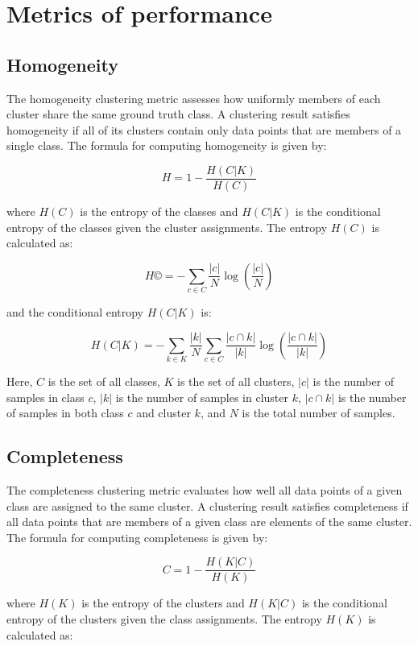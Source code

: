 \documentclass[a4paper,12pt]{article}
\begin{document}
		

	
	
	
\newpage
\section{Metrics of performance}

	\subsection*{Homogeneity}
		
		The homogeneity clustering metric assesses how uniformly members of each cluster share the same ground truth class. A clustering result satisfies homogeneity if all of its clusters contain only data points that are members of a single class. The formula for computing homogeneity is given by:
		
		\[ H = 1 - \frac{H(C|K)}{H(C)} \]
		
		where $H(C)$ is the entropy of the classes and $H(C|K)$ is the conditional entropy of the classes given the cluster assignments. The entropy $H(C)$ is calculated as:
		
		\[ H© = - \sum_{c \in C} \frac{|c|}{N} \log \left( \frac{|c|}{N} \right) \]
		
		and the conditional entropy $H(C|K)$ is:
		
		\[ H(C|K) = - \sum_{k \in K} \frac{|k|}{N} \sum_{c \in C} \frac{|c \cap k|}{|k|} \log \left( \frac{|c \cap k|}{|k|} \right) \]
		
		Here, $C$ is the set of all classes, $K$ is the set of all clusters, $|c|$ is the number of samples in class $c$, $|k|$ is the number of samples in cluster $k$, $|c \cap k|$ is the number of samples in both class $c$ and cluster $k$, and $N$ is the total number of samples.
	
	\subsection*{Completeness}
		 
		The completeness clustering metric evaluates how well all data points of a given class are assigned to the same cluster. A clustering result satisfies completeness if all data points that are members of a given class are elements of the same cluster. The formula for computing completeness is given by:
		
		\[ C = 1 - \frac{H(K|C)}{H(K)} \]
		
		where $H(K)$ is the entropy of the clusters and $H(K|C)$ is the conditional entropy of the clusters given the class assignments. The entropy $H(K)$ is calculated as:
		
\end{document}
